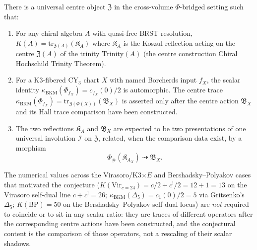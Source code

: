 \begin{conjecture}
\label{conj:universal-trace-identity}
\ClaimStatusConjectured
There is a universal centre object $\mathfrak{Z}$ in the cross-volume
$\Phi$-bridged setting such that:
\begin{enumerate}
 \item For any chiral algebra $A$ with quasi-free BRST resolution,
 $K(A) = \mathrm{tr}_{\mathfrak{Z}(A)}(\mathfrak{K}_A)$ where
 $\mathfrak{K}_A$ is the Koszul reflection acting on the centre
 $\mathfrak{Z}(A)$ of the trinity $\mathrm{Trinity}(A)$
 \textup{(}the centre construction Chiral Hochschild Trinity Theorem\textup{).}
 \item For a K$3$-fibered CY$_3$ chart \(X\) with named Borcherds input
 \(f_X\), the scalar identity
 \(\kappa_{\mathrm{BKM}}(\Phi_{f_X})=c_{f_X}(0)/2\) is automorphic.
 The centre trace
 \(\kappa_{\mathrm{BKM}}(\Phi_{f_X}) =
 \mathrm{tr}_{\mathfrak{Z}(\Phi(X))}(\mathfrak{B}_X)\) is asserted only
 after the centre action \(\mathfrak B_X\) and its Hall trace comparison
 have been constructed.
 \item The two reflections $\mathfrak{K}_A$ and $\mathfrak{B}_X$ are
 expected to be two presentations of one universal involution
 $\mathcal{I}$ on $\mathfrak{Z}$, related, when the comparison data
 exist, by a morphism
\[
 \Phi_\#(\mathfrak{K}_{A_X})\;\dashrightarrow\;\mathfrak{B}_X .
\]
\end{enumerate}
The numerical values across the Virasoro/K3$\times E$ and Bershadsky--Polyakov
cases that motivated the conjecture
($K(\mathrm{Vir}_{c=24}) = c/2 + c^!/2 = 12 + 1 = 13$ on the
Virasoro self-dual line $c + c^! = 26$; $\kappa_{\mathrm{BKM}}(\Delta_5) =
c_1(0)/2 = 5$ via Gritsenko's $\Delta_5$; $K(\mathrm{BP}) = 50$ on the
Bershadsky--Polyakov self-dual locus) are \emph{not} required to
coincide or to sit in any scalar ratio: they are traces of different
operators after the corresponding centre actions have been constructed,
and the conjectural content is the comparison of those operators, not a
rescaling of their scalar shadows.
\end{conjecture}

